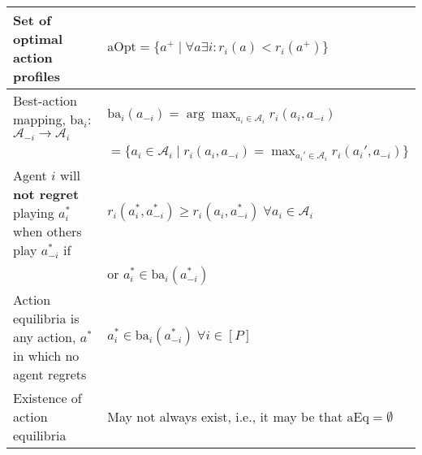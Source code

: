 \begin{summary}
\begin{center}
\begin{tabular}{ll}
            \midrule 
            Set of optimal action profiles & $\text{aOpt} = \{a^+ \mid \forall a \exists i: r_i(a) < r_i(a^+)\}$ \\
            \midrule
            Best-action mapping, $\text{ba}_i$: $\mathcal{A}_{-i} \to \mathcal{A}_i$ & $\text{ba}_i (a_{-i}) = \arg \max_{a_i \in \mathcal{A}_i} r_i (a_i,a_{-i})$ \\
            & $ = \{a_i \in \mathcal{A}_i \mid r_i (a_i,a_{-i}) = \max_{a_i' \in \mathcal{A}_i} r_i (a_i',a_{-i})\}$ \\
            \midrule 
            Agent $i$ will \textbf{not regret} playing $a_i^*$ when others play $a_{-i}^*$ if & $r_i (a_i^*,a_{-i}^*) \geq r_i (a_i,a_{-i}^*) \; \forall a_i \in \mathcal{A}_i$ \\
            & or $a_i^* \in \text{ba}_i (a_{-i}^*)$ \\
            \midrule
            Action equilibria is any action, $a^*$ in which no agent regrets & $a_i^* \in \text{ba}_i (a_{-i}^*) \; \forall i \in [P]$ \\
            \midrule
            Existence of action equilibria & May not always exist, i.e., it may be that $\text{aEq} = \emptyset$ \\
            \bottomrule            
        \end{tabular}
    \end{center}
\end{summary}
\newpage

